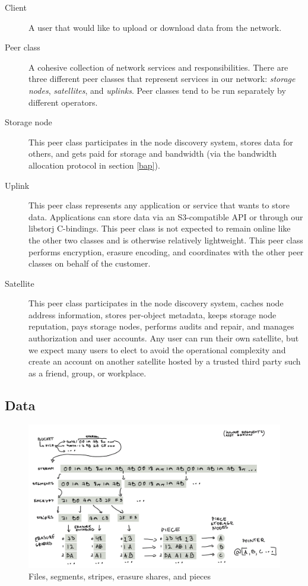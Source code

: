 \documentclass[11pt,fleqn,openany]{book}
\begin{document}
\begin{description}
\item[Client] A user that would like to upload or download data from the network.

\item[Peer class] A cohesive collection of network services and
  responsibilities. There are three different peer classes that represent
  services in our network: {\em storage nodes}, {\em satellites}, and {\em uplinks}.
  Peer classes   tend to be run separately by different operators.

\item[Storage node] This peer class participates in the node discovery
  system, stores data for others, and gets paid for storage and bandwidth
  (via the bandwidth allocation protocol in section \ref{bap}).

\item[Uplink] This peer class represents any application or
  service that wants to store data. Applications can store data via an
  S3-compatible API or through our libstorj C-bindings. This peer class
  is not expected to remain online like the other two classes and is otherwise
  relatively lightweight. This peer class performs encryption, erasure encoding,
  and coordinates with the other peer classes on behalf of the customer.

\item[Satellite] This peer class participates in the node discovery system,
  caches node address information, stores per-object metadata, keeps storage
  node reputation, pays storage nodes, performs audits and repair, and manages
  authorization and user accounts.
  Any user can run their own satellite, but we expect many users
  to elect to avoid the operational complexity and create an account on
  another satellite hosted by a trusted third party such as a friend, group, or
  workplace.
\end{description}

\subsection{Data}

\begin{figure}
\centering
\includegraphics[width=\textwidth]{diagram-drafts/data-flow-diagram.png}
\caption{Files, segments, stripes, erasure shares, and pieces}
\end{figure}
\end{document}
